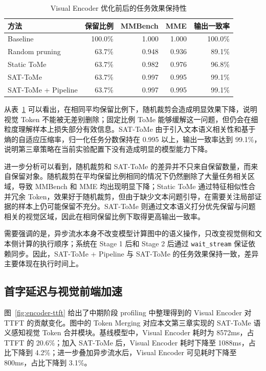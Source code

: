 \begin{table}[!htbp]
\centering
\small
\caption{Visual Encoder 优化前后的任务效果保持性}
\label{tab:encoder-quality}
\begin{tabular}{lrrrr}
\hline
方法 & 保留比例 & MMBench & MME & 输出一致率 \\
\hline
Baseline & 100.0\% & 1.000 & 1.000 & 100.0\% \\
Random pruning & 63.7\% & 0.948 & 0.936 & 89.1\% \\
Static ToMe & 63.7\% & 0.982 & 0.976 & 96.8\% \\
SAT-ToMe & 63.7\% & 0.997 & 0.995 & 99.1\% \\
SAT-ToMe + Pipeline & 63.7\% & 0.997 & 0.995 & 99.1\% \\
\hline
\end{tabular}
\end{table}

从表~\ref{tab:encoder-quality} 可以看出，在相同平均保留比例下，随机裁剪会造成明显效果下降，说明视觉 Token 不能被无差别删除；固定比例 ToMe 能够缓解这一问题，但仍会在细粒度理解样本上损失部分有效信息。SAT-ToMe 由于引入文本语义相关性和基于熵的自适应压缩率，归一化任务分数保持在 0.995 以上，输出一致率达到 99.1\%，说明第三章策略在当前实验配置下没有造成明显的模型能力下降。

进一步分析可以看到，随机裁剪和 SAT-ToMe 的差异并不只来自保留数量，而来自保留对象。随机裁剪在平均保留比例相同的情况下仍然删除了大量任务相关区域，导致 MMBench 和 MME 均出现明显下降；Static ToMe 通过特征相似性合并冗余 Token，效果好于随机裁剪，但由于缺少文本问题引导，在需要关注局部证据的样本上仍可能保留不充分。SAT-ToMe 则通过文本语义打分优先保留与问题相关的视觉区域，因此在相同保留比例下取得更高输出一致率。

需要强调的是，异步流水本身不改变模型计算图中的语义操作，只改变视觉侧和文本侧计算的执行顺序；系统在 Stage 1 后和 Stage 2 后通过 \texttt{wait\_stream} 保证依赖同步。因此，SAT-ToMe + Pipeline 与 SAT-ToMe 的任务效果保持一致，差异主要体现在执行时间上。

\subsection{首字延迟与视觉前端加速}
图~\ref{fig:encoder-ttft} 给出了中期阶段 profiling 中整理得到的 Visual Encoder 对 TTFT 的贡献变化。图中的 Token Merging 对应本文第三章实现的 SAT-ToMe 语义感知视觉 Token 合并模块。基线模型中，Visual Encoder 耗时为 8572ms，占 TTFT 的 20.6\%；加入 SAT-ToMe 后，Visual Encoder 耗时下降至 1088ms，占比下降到 4.2\%；进一步叠加异步流水后，Visual Encoder 可见耗时下降至 800ms，占比下降到 3.1\%。

